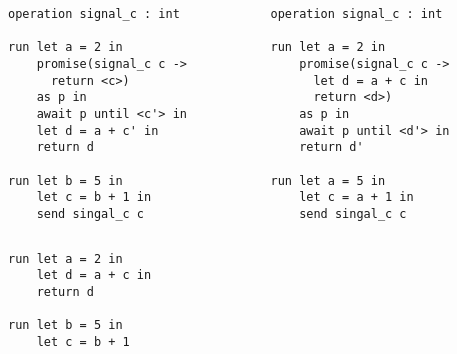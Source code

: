 \documentclass{beamer}
\theoremstyle{definition} %
\theoremstyle{plain} %
\begin{document}
	\begin{frame}[fragile]{\aeff{}}

		\begin{columns}[T]
			\begin{column}{0.49\textwidth}
				\begin{lstlisting}[basicstyle=\tiny]
operation signal_c : int		

run let a = 2 in
    promise(signal_c c -> 
      return <c>)
    as p in
    await p until <c'> in
    let d = a + c' in
    return d 

run let b = 5 in
    let c = b + 1 in
    send singal_c c
				\end{lstlisting}
			\end{column}
		
		
			\begin{column}{0.49\textwidth}
				\begin{lstlisting}[basicstyle=\tiny]
operation signal_c : int		

run let a = 2 in
    promise(signal_c c -> 
      let d = a + c in
      return <d>)
    as p in
    await p until <d'> in
    return d'

run let a = 5 in
    let c = a + 1 in
    send singal_c c
				\end{lstlisting}
			\end{column}
		\end{columns}
	
		
		\vspace{5ex}
		\begin{columns}[T]
			\begin{column}{0.49\textwidth}
				\begin{lstlisting}[basicstyle=\tiny]
run let a = 2 in
    let d = a + c in
    return d 

run let b = 5 in
    let c = b + 1
				\end{lstlisting}
			\end{column}
			
			
			\begin{column}{0.49\textwidth}
				\begin{lstlisting}[basicstyle=\tiny]

				\end{lstlisting}
			\end{column}
		\end{columns}


		
	\end{frame}
\end{document}
